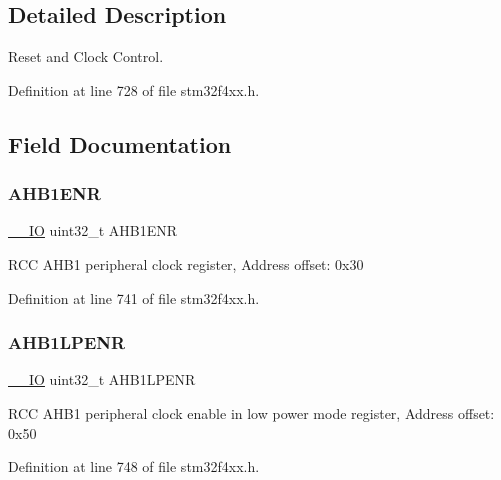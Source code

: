 \subsection{Detailed Description}
Reset and Clock Control. 

Definition at line 728 of file stm32f4xx.\+h.



\subsection{Field Documentation}
\mbox{\label{struct_r_c_c___type_def_a1e9c75b06c99d0611535f38c7b4aa845}} 
\subsubsection{\texorpdfstring{A\+H\+B1\+E\+NR}{AHB1ENR}}
{\footnotesize\ttfamily \hyperlink{group___c_m_s_i_s__core__definitions_gaec43007d9998a0a0e01faede4133d6be}{\+\_\+\+\_\+\+IO} uint32\+\_\+t A\+H\+B1\+E\+NR}

R\+CC A\+H\+B1 peripheral clock register, Address offset\+: 0x30 

Definition at line 741 of file stm32f4xx.\+h.

\mbox{\label{struct_r_c_c___type_def_aae70b1922167eb58d564cb82d39fd10b}} 
\subsubsection{\texorpdfstring{A\+H\+B1\+L\+P\+E\+NR}{AHB1LPENR}}
{\footnotesize\ttfamily \hyperlink{group___c_m_s_i_s__core__definitions_gaec43007d9998a0a0e01faede4133d6be}{\+\_\+\+\_\+\+IO} uint32\+\_\+t A\+H\+B1\+L\+P\+E\+NR}

R\+CC A\+H\+B1 peripheral clock enable in low power mode register, Address offset\+: 0x50 

Definition at line 748 of file stm32f4xx.\+h.

\mbox{\label{struct_r_c_c___type_def_a46c20c598e9e12f919f0ea47ebcbc90f}} 
